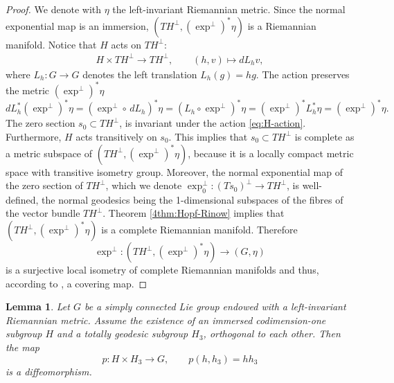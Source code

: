 \documentclass[reqno]{amsart}
\newtheorem{lemma}[theorem]{Lemma}
\theoremstyle{remark}
\theoremstyle{plain}
\begin{document}
\begin{proof}
    We denote with $\eta$ the left-invariant Riemannian metric. Since the normal exponential map is an immersion, $(TH^\perp,(\exp^{\perp})^*\eta)$ is a Riemannian manifold. 
    Notice that $H$ acts on $TH^\perp$:
    \begin{equation}\label{eq:H-action}
        \begin{aligned}
            H\times TH^\perp\to TH^\perp,\qquad 
            (h,v)\mapsto dL_{h}v,
        \end{aligned}
    \end{equation}
    where $L_h:G\to G$ denotes the left translation $L_h(g)=hg$.
    The action preserves the metric $(\exp^{\perp})^*\eta$
    \begin{equation}
        dL_h^*(\exp^{\perp})^*\eta=(\exp^\perp\circ\,dL_h)^*\eta=(L_h\circ\exp^\perp)^*\eta=(\exp^{\perp})^* L_h^*\eta=(\exp^{\perp})^*\eta.
    \end{equation}
    The zero section $s_0\subset TH^\perp$, is invariant under the action \eqref{eq:H-action}. Furthermore, $H$ acts transitively on $s_0$. This implies that $s_0\subset TH^\perp$ is complete as a metric subspace of $(TH^\perp,(\exp^{\perp})^*\eta)$, because it is  a locally compact metric space with transitive isometry group.
    Moreover, the normal exponential map of the zero section of $TH^\perp$, which we denote $\exp^{\perp}_0:\left(Ts_0\right)^\perp\to TH^\perp$, is well-defined, the normal geodesics being the 1-dimensional subspaces of the fibres of the vector bundle $TH^\perp$. Theorem \ref{4thm:Hopf-Rinow} implies that $(TH^\perp,(\exp^{\perp})^*\eta)$ is a complete Riemannian manifold. Therefore
    \begin{equation}
        \exp^{\perp}:(TH^\perp,(\exp^{\perp})^*\eta)\to (G,\eta)
    \end{equation}
    is a surjective local isometry of complete Riemannian manifolds and thus, according to \cite[Lem.\ 3.3, Chap.\ 7]{DoCarmo}, a covering map.
\end{proof}
\begin{lemma}\label{lem:orthogonal_groups}
	Let \(G\) be a simply connected Lie group endowed with a left-invariant Riemannian metric. Assume the existence of an immersed codimension-one subgroup \(H\) and a totally geodesic subgroup \(H_3\), orthogonal to each other. Then the map
	\[
	p:H \times H_3 \longrightarrow G, \qquad p(h,h_3)=hh_3
	\]
	is a diffeomorphism.
\end{lemma}
\end{document}
